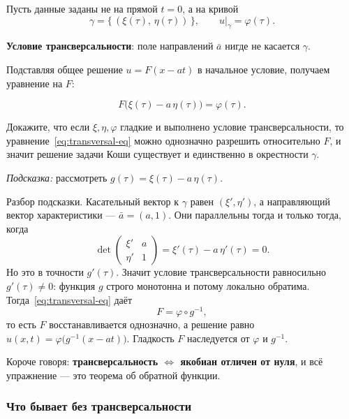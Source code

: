 Пусть данные заданы не на прямой $t=0$, а на кривой
\[
  \gamma = \big\{\, (\xi(\tau),\, \eta(\tau)) \,\big\},
  \qquad u|_\gamma = \varphi(\tau) .
\]

\begin{definition}
\textbf{Условие трансверсальности}: поле направлений $\bar a$ нигде не касается
$\gamma$.
\end{definition}


Подставляя общее решение $u = F(x - at)$ в начальное условие, получаем уравнение
на $F$:

\begin{equation}\tag{6}\label{eq:transversal-eq}
  F\big(\xi(\tau) - a\,\eta(\tau)\big) = \varphi(\tau) .
\end{equation}

\begin{exercise}
Докажите, что если $\xi, \eta, \varphi$ гладкие и выполнено условие
трансверсальности, то уравнение~\eqref{eq:transversal-eq} можно однозначно
разрешить относительно $F$, и значит решение задачи Коши существует и
единственно в окрестности $\gamma$.

\medskip
\emph{Подсказка:} рассмотреть $g(\tau) = \xi(\tau) - a\,\eta(\tau)$.
\end{exercise}

\begin{idea}
Разбор подсказки. Касательный вектор к $\gamma$ равен $(\xi', \eta')$, а
направляющий вектор характеристики — $\bar a = (a, 1)$. Они параллельны тогда и
только тогда, когда
\[
  \det \begin{pmatrix} \xi' & a \\ \eta' & 1 \end{pmatrix}
  = \xi'(\tau) - a\,\eta'(\tau) = 0 .
\]
Но это в точности $g'(\tau)$. Значит условие трансверсальности равносильно
$g'(\tau) \ne 0$: функция $g$ строго монотонна и потому локально обратима.
Тогда~\eqref{eq:transversal-eq} даёт
\[
  F = \varphi \circ g^{-1} ,
\]
то есть $F$ восстанавливается однозначно, а решение равно
$u(x,t) = \varphi\big(g^{-1}(x - at)\big)$. Гладкость $F$ наследуется от
$\varphi$ и $g^{-1}$.

\medskip
Короче говоря: \textbf{трансверсальность $\iff$ якобиан отличен от нуля}, и всё
упражнение — это теорема об обратной функции.
\end{idea}

\subsubsection*{Что бывает без трансверсальности}

